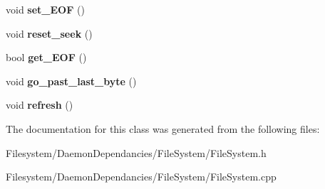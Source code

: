\begin{DoxyCompactItemize}
\item 
void {\bfseries set\+\_\+\+E\+OF} ()\hypertarget{classFileOpen_a1523bffc4bc58984b53b309eb92cc8b9}{}\label{classFileOpen_a1523bffc4bc58984b53b309eb92cc8b9}

\item 
void {\bfseries reset\+\_\+seek} ()\hypertarget{classFileOpen_a1008411faf6df97c71d0ac0a867fce11}{}\label{classFileOpen_a1008411faf6df97c71d0ac0a867fce11}

\item 
bool {\bfseries get\+\_\+\+E\+OF} ()\hypertarget{classFileOpen_afc9043c99b42afaaa5f1712f5a45e066}{}\label{classFileOpen_afc9043c99b42afaaa5f1712f5a45e066}

\item 
void {\bfseries go\+\_\+past\+\_\+last\+\_\+byte} ()\hypertarget{classFileOpen_a966a424badc21c4cfc9b80854a052acb}{}\label{classFileOpen_a966a424badc21c4cfc9b80854a052acb}

\item 
void {\bfseries refresh} ()\hypertarget{classFileOpen_ac10189670f476050bc3fdb44d74dcb33}{}\label{classFileOpen_ac10189670f476050bc3fdb44d74dcb33}

\end{DoxyCompactItemize}


The documentation for this class was generated from the following files\+:\begin{DoxyCompactItemize}
\item 
Filesystem/\+Daemon\+Dependancies/\+File\+System/File\+System.\+h\item 
Filesystem/\+Daemon\+Dependancies/\+File\+System/File\+System.\+cpp\end{DoxyCompactItemize}
